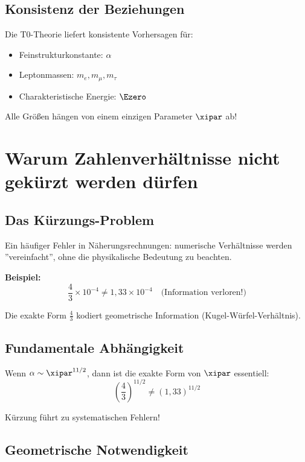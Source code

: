 	\subsection{Konsistenz der Beziehungen}
	
	Die T0-Theorie liefert konsistente Vorhersagen für:
	\begin{itemize}
		\item Feinstrukturkonstante: $\alpha$
		\item Leptonmassen: $m_e, m_\mu, m_\tau$
		\item Charakteristische Energie: $\Ezero$
	\end{itemize}
	
	Alle Größen hängen von einem einzigen Parameter $\xipar$ ab!
	
	\section{Warum Zahlenverhältnisse nicht gekürzt werden dürfen}
	
	\subsection{Das Kürzungs-Problem}
	
	Ein häufiger Fehler in Näherungsrechnungen: numerische Verhältnisse werden ''vereinfacht'', ohne die physikalische Bedeutung zu beachten.
	
	\textbf{Beispiel:}
	\begin{equation}
		\frac{4}{3} \times 10^{-4} \neq 1{,}33 \times 10^{-4} \quad \text{(Information verloren!)}
	\end{equation}
	
	Die exakte Form $\frac{4}{3}$ kodiert geometrische Information (Kugel-Würfel-Verhältnis).
	
	\subsection{Fundamentale Abhängigkeit}
	
	Wenn $\alpha \sim \xipar^{11/2}$, dann ist die exakte Form von $\xipar$ essentiell:
	\begin{equation}
		\left(\frac{4}{3}\right)^{11/2} \neq (1{,}33)^{11/2}
	\end{equation}
	
	Kürzung führt zu systematischen Fehlern!
	
	\subsection{Geometrische Notwendigkeit}
	
